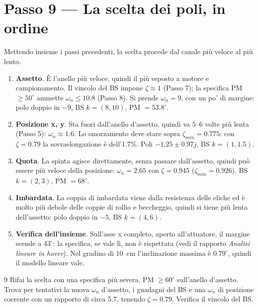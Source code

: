 \documentclass[11pt,a4paper]{article}
\begin{document}
\section{Passo 9 --- La scelta dei poli, in ordine}

Mettendo insieme i passi precedenti, la scelta procede dal canale più veloce al più lento.

\begin{enumerate}
  \item \textbf{Assetto}. È l'anello più veloce, quindi il più esposto a motore e campionamento. Il vincolo del BS impone $\zeta \approx 1$ (Passo 7); la specifica PM $\ge 50^\circ$ ammette $\omega_n \le 10.8$ (Passo 8). Si prende $\omega_n = 9$, con un po' di margine: polo doppio in $-9$, BS $k = (8, 10)$, PM $= 53.8^\circ$.
  \item \textbf{Posizione x, y}. Sta fuori dall'anello d'assetto, quindi va $5$--$6$ volte più lenta (Passo 5): $\omega_n \approx 1.6$. Lo smorzamento deve stare sopra $\zeta_{min} = 0.775$: con $\zeta = 0.79$ la sovraelongazione è dell'1.7\%. Poli $-1.25 \pm 0.97j$, BS $k = (1, 1.5)$.
  \item \textbf{Quota}. La spinta agisce direttamente, senza passare dall'assetto, quindi può essere più veloce della posizione: $\omega_n = 2.65$ con $\zeta = 0.945$ ($\zeta_{min} = 0.926$). BS $k = (2, 3)$, PM $= 68^\circ$.
  \item \textbf{Imbardata}. La coppia di imbardata viene dalla resistenza delle eliche ed è molto più debole delle coppie di rollio e beccheggio, quindi si tiene più lenta dell'assetto: polo doppio in $-5$, BS $k = (4, 6)$.
  \item \textbf{Verifica dell'insieme}. Sull'asse x completo, aperto all'attuatore, il margine scende a $43^\circ$: la specifica, se vale lì, non è rispettata (vedi il rapporto \emph{Analisi lineare in hover}). Nel gradino di 10~cm l'inclinazione massima è $0.79^\circ$, quindi il modello lineare vale.
\end{enumerate}

\begin{esercizio}{9}
Rifai la scelta con una specifica più severa, PM $\ge 60^\circ$ sull'anello d'assetto. Trova per tentativi la nuova $\omega_n$ d'assetto, i guadagni del BS e una $\omega_n$ di posizione coerente con un rapporto di circa 5.7, tenendo $\zeta = 0.79$. Verifica il vincolo del BS.
\end{esercizio}
\end{document}
